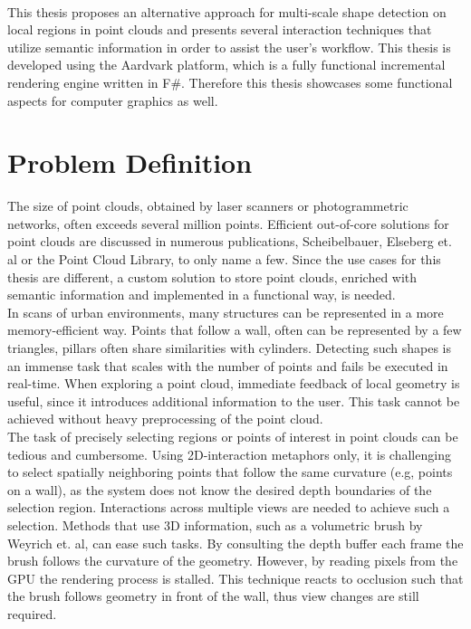 \\
This thesis proposes an alternative approach for multi-scale shape detection on local regions in point clouds and presents several interaction techniques that utilize semantic information in order to assist the user's workflow. This thesis is developed using the Aardvark platform, which is a fully functional incremental rendering engine written in F\#. Therefore this thesis showcases some functional aspects for computer graphics as well. 

\section{Problem Definition}

The size of point clouds, obtained by laser scanners or photogrammetric networks, often exceeds several million points. 
Efficient out-of-core solutions for point clouds are discussed in numerous publications, Scheibelbauer\cite{scheiblauer-thesis}, Elseberg et. al\cite{elseberg2013one} or the Point Cloud Library\cite{rusu20113d}, to only name a few. Since the use cases for this thesis are different, a custom solution to store point clouds, enriched with semantic information and implemented in a functional way, is needed. 
\\
In scans of urban environments, many structures can be represented in a more memory-efficient way. Points that follow a wall, often can be represented by a few triangles, pillars often share similarities with cylinders. Detecting such shapes is an immense task that scales with the number of points and fails be executed in real-time. When exploring a point cloud, immediate feedback of local geometry is useful, since it introduces additional information to the user. This task cannot be achieved without heavy preprocessing of the point cloud. 
\\
The task of precisely selecting regions or points of interest in point clouds can be tedious and cumbersome. Using 2D-interaction metaphors only, it is challenging to
select spatially neighboring points that follow the same curvature (e.g, points on a wall), as the system does not know the desired depth boundaries of the selection region. Interactions across multiple views are needed to achieve such a selection.  Methods that use 3D information, such as a volumetric brush by Weyrich et. al\cite{weyrich2004post}, can ease such tasks. By consulting the depth buffer each frame the brush follows the curvature of the geometry. However, by reading pixels from the GPU the rendering process is stalled. This technique reacts to occlusion such that the brush follows geometry in front of the wall, thus view changes are still required.



